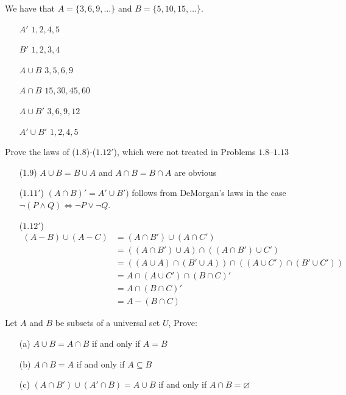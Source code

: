 \answer
We have that $A = \{3, 6, 9, \ldots\}$ and $B = \{5, 10, 15, \ldots\}$.

\begin{itemize}
    \item[$A'$]
        $1, 2, 4, 5$
    \item[$B'$]
        $1, 2, 3, 4$
    \item[$A \cup B$]
        $3, 5, 6, 9$
    \item[$A \cap B$]
        $15, 30, 45, 60$
    \item[$A \cup B'$]
        $3, 6, 9, 12$
    \item[$A' \cup B'$]
        $1, 2, 4, 5$
\end{itemize}


\exercise
Prove the laws of ($1.8$)-($1.12'$), which were not treated in Problems $1.8$--$1.13$

\answer
\begin{itemize}
    \item[(1.9)] 
        $A \cup B = B \cup A$ and $A \cap B = B \cap A$ are obvious
    \item[($1.11'$)]
        $(A \cap B)' = A' \cup B')$ follows from DeMorgan's laws in the case $\neg(P \wedge Q) \iff \neg P \vee \neg Q$.
    \item[($1.12'$)]
        \begin{align*}
            (A - B) \cup (A - C) &= (A \cap B') \cup (A \cap C') \\
                                 &= ((A \cap B') \cup A) \cap ((A \cap B') \cup C') \\
                                 &= ((A \cup A) \cap (B' \cup A)) \cap ((A \cup C') \cap (B' \cup C')) \\
                                 &= A \cap (A \cup C') \cap (B \cap C)' \\
                                 &= A \cap (B \cap C)' \\
                                 &= A - (B \cap C)
        \end{align*}
\end{itemize}


\exercise
Let $A$ and $B$ be subsets of a universal set $U$, Prove:
\begin{itemize}
    \item[(a)]
        $A \cup B = A \cap B$ if and only if $A = B$
    \item[(b)]
        $A \cap B = A$ if and only if $A \subseteq B$
    \item[(c)]
        $(A \cap B') \cup (A' \cap B) = A \cup B$ if and only if $A \cap B = \varnothing$
\end{itemize}

